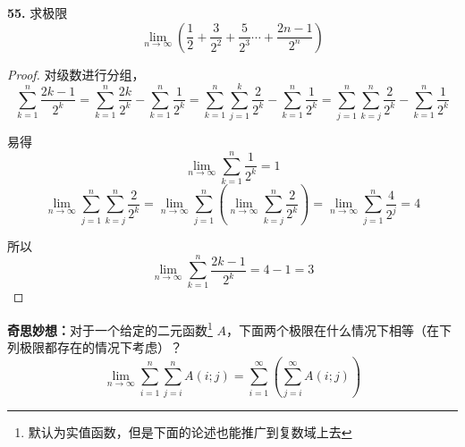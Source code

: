 \textbf{55.} 求极限
\[\lim_{n \rightarrow \infty} \left(\frac{1}{2} + \frac{3}{2^2} + \frac{5}{2^3} \cdots + \frac{2n-1}{2^n}\right)\]
\begin{proof}
    对级数进行分组，
    \[\sum_{k=1}^{n} \frac{2k-1}{2^k} = \sum_{k=1}^{n} \frac{2k}{2^k} - \sum_{k=1}^{n} \frac{1}{2^k} = \sum_{k=1}^{n}\sum_{j=1}^{k}\frac{2}{2^k} - \sum_{k=1}^{n} \frac{1}{2^k} = \sum_{j=1}^{n} \sum_{k=j}^{n} \frac{2}{2^k} - \sum_{k=1}^{n}\frac{1}{2^k}\]

    易得
    \[\lim_{n \rightarrow \infty} \sum_{k=1}^{n} \frac{1}{2^k} = 1\]
    \[\lim_{n \rightarrow \infty} \sum_{j=1}^{n}\sum_{k=j}^{n} \frac{2}{2^k} = \lim_{n \rightarrow \infty} \sum_{j=1}^{n} \left(\lim_{n \rightarrow \infty} \sum_{k=j}^{n} \frac{2}{2^k}\right) = \lim_{n \rightarrow \infty} \sum_{j=1}^{n} \frac{4}{2^j} = 4\]

    所以
    \[\lim_{n \rightarrow \infty} \sum_{k=1}^{n} \frac{2k-1}{2^k} = 4 - 1 = 3\]
\end{proof}\vspace{9pt}

\newpage
\textbf{奇思妙想：}对于一个给定的二元函数\footnote{默认为实值函数，但是下面的论述也能推广到复数域上去} $A$，下面两个极限在什么情况下相等（在下列极限都存在的情况下考虑）？
\[\lim_{n \rightarrow \infty} \sum_{i=1}^{n}\sum_{j=i}^{n} A(i;j) = \sum_{i=1}^{\infty} \left(\sum_{j=i}^{\infty} A(i;j)\right)\]

